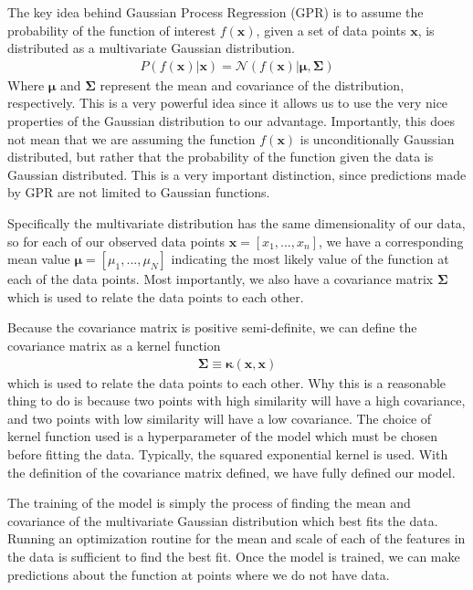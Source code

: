 The key idea behind Gaussian Process Regression (GPR) is to assume the probability of the function of interest $f(\textbf{x})$, given a set of data points $\textbf{x}$, is distributed as a multivariate Gaussian distribution.
\begin{align}
    P(f(\textbf{x})|\textbf{x}) = \mathcal{N}(f(\textbf{x})|\boldsymbol{\mu},\boldsymbol{\Sigma})
\end{align}
Where $\boldsymbol{\mu}$ and $\boldsymbol{\Sigma}$ represent the mean and covariance of the distribution, respectively. This is a very powerful idea since it allows us to use the very nice properties of the Gaussian distribution to our advantage. Importantly, this does not mean that we are assuming the function $f(\textbf{x})$ is unconditionally Gaussian distributed, but rather that the probability of the function given the data is Gaussian distributed. This is a very important distinction, since
predictions made by GPR are not limited to Gaussian functions. 

Specifically the multivariate distribution has the same dimensionality of our data, so for each of our observed data points $\textbf{x} = [x_1, ..., x_n]$, we have a corresponding mean value 
$\boldsymbol{\mu} = [\mu_1, ..., \mu_N]$ indicating the most likely value of the function at each of the data points. Most importantly, we also have a covariance matrix $\boldsymbol{\Sigma}$ which is used to relate the data points to each other. 

Because the covariance matrix is positive semi-definite, we can define the covariance matrix as a kernel function 
\begin{align}
    \boldsymbol{\Sigma} \equiv \boldsymbol{\kappa}(\textbf{x},\textbf{x})
\end{align}
which is used to relate the data points to each other. Why this is a reasonable thing
to do is because two points with high similarity will have a high covariance, and two points with low similarity will have a low covariance. The choice of kernel function used is
a hyperparameter of the model which must be chosen before fitting the data. Typically, the squared exponential kernel is used. With the definition of the covariance matrix defined, 
we have fully defined our model.

The training of the model is simply the process of finding the mean and covariance of the multivariate Gaussian distribution which best fits the data. Running an optimization routine for 
the mean and scale of each of the features in the data is sufficient to find the best fit. Once the model is trained, we can make predictions about the function at points where we do not have data.

